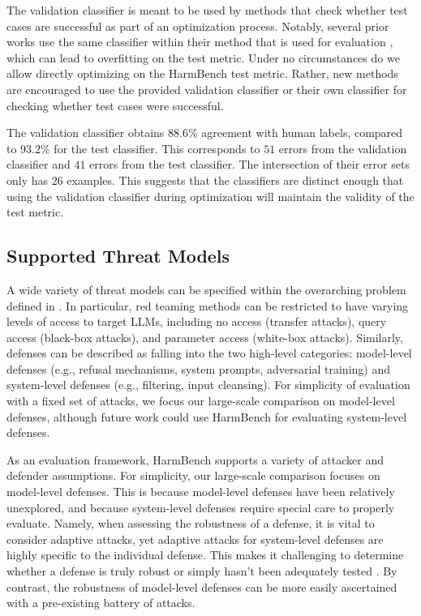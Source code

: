 The validation classifier is meant to be used by methods that check whether test cases are successful as part of an optimization process. Notably, several prior works use the same classifier within their method that is used for evaluation \citep{chao2023jailbreaking, mehrotra2023treeOfAttacks}, which can lead to overfitting on the test metric. Under no circumstances do we allow directly optimizing on the HarmBench test metric. Rather, new methods are encouraged to use the provided validation classifier or their own classifier for checking whether test cases were successful.

The validation classifier obtains $88.6\%$ agreement with human labels, compared to $93.2\%$ for the test classifier. This corresponds to $51$ errors from the validation classifier and $41$ errors from the test classifier. The intersection of their error sets only has $26$ examples. This suggests that the classifiers are distinct enough that using the validation classifier during optimization will maintain the validity of the test metric.





\subsection{Supported Threat Models}
A wide variety of threat models can be specified within the overarching problem defined in . In particular, red teaming methods can be restricted to have varying levels of access to target LLMs, including no access (transfer attacks), query access (black-box attacks), and parameter access (white-box attacks). Similarly, defenses can be described as falling into the two high-level categories: model-level defenses (e.g., refusal mechanisms, system prompts, adversarial training) and system-level defenses (e.g., filtering, input cleansing). For simplicity of evaluation with a fixed set of attacks, we focus our large-scale comparison on model-level defenses, although future work could use HarmBench for evaluating system-level defenses.

As an evaluation framework, HarmBench supports a variety of attacker and defender assumptions. For simplicity, our large-scale comparison focuses on model-level defenses. This is because model-level defenses have been relatively unexplored, and because system-level defenses require special care to properly evaluate. Namely, when assessing the robustness of a defense, it is vital to consider adaptive attacks, yet adaptive attacks for system-level defenses are highly specific to the individual defense. This makes it challenging to determine whether a defense is truly robust or simply hasn't been adequately tested \citep{athalye2018obfuscated}. By contrast, the robustness of model-level defenses can be more easily ascertained with a pre-existing battery of attacks.

